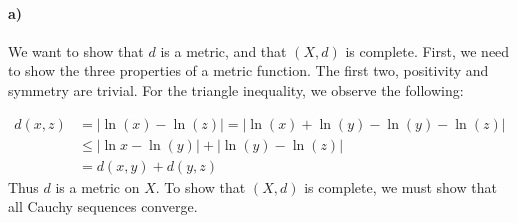 \documentclass[a4paper]{article}
\theoremstyle{definition}
\begin{document}
\paragraph{a)}
We want to show that $d$ is a metric, and that $\left( X, d \right)$ is complete.
First, we need to show the three properties of a metric function. The first two, positivity and symmetry
are trivial.
For the triangle inequality, we observe the following:

\begin{align*}
  d(x, z) &= | \ln(x) - \ln(z)| = | \ln(x) + \ln(y) - \ln(y) - \ln(z) | \\
          &\leq |\ln x - \ln(y) | + |\ln(y) - \ln(z) | \\
          &= d(x, y) + d(y, z)
\end{align*}
Thus $d$ is a metric on $X$. To show that $\left( X, d \right)$ is complete, we
must show that all Cauchy sequences converge.
\end{document}
